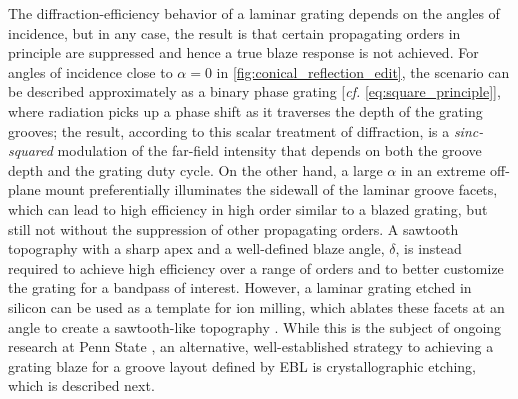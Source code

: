 The diffraction-efficiency behavior of a laminar grating depends on the angles of incidence, but in any case, the result is that certain propagating orders in principle are suppressed and hence a true blaze response is not achieved. %
For angles of incidence close to $\alpha = 0$ in \cref{fig:conical_reflection_edit}, the scenario can be described approximately as a binary phase grating [\emph{cf.\@} \cref{eq:square_principle}], where radiation picks up a phase shift as it traverses the depth of the grating grooves; the result, according to this scalar treatment of diffraction, is a \emph{sinc-squared} modulation of the far-field intensity that depends on both the groove depth and the grating duty cycle. 
On the other hand, a large $\alpha$ in an extreme off-plane mount preferentially illuminates the sidewall of the laminar groove facets, which can lead to high efficiency in high order similar to a blazed grating, but still not without the suppression of other propagating orders. 
A sawtooth topography with a sharp apex and a well-defined blaze angle, $\delta$, is instead required to achieve high efficiency over a range of orders and to better customize the grating for a bandpass of interest. 
However, a laminar grating etched in silicon can be used as a template for ion milling, which ablates these facets at an angle to create a sawtooth-like topography \cite{Johnson79,Liu13}. 
While this is the subject of ongoing research at Penn State \cite{Miles2019_ion_mill}, an alternative, well-established strategy to achieving a grating blaze for a groove layout defined by EBL is crystallographic etching, which is described next. 

